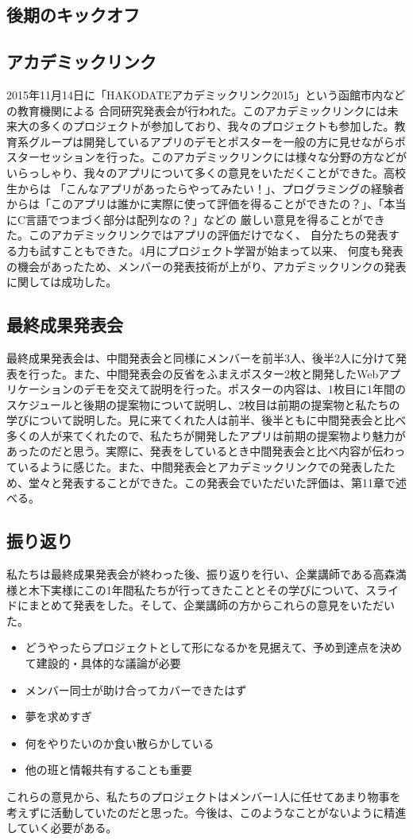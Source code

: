 \documentclass[openany,11pt,papersize]{jsbook}
\begin{document}
\subsection{後期のキックオフ}

\subsection{アカデミックリンク}
2015年11月14日に「HAKODATEアカデミックリンク2015」という函館市内などの教育機関による
合同研究発表会が行われた。このアカデミックリンクには未来大の多くのプロジェクトが参加しており、我々のプロジェクトも参加した。教育系グループは開発しているアプリのデモとポスターを一般の方に見せながらポスターセッションを行った。このアカデミックリンクには様々な分野の方などがいらっしゃり、我々のアプリについて多くの意見をいただくことができた。高校生からは
「こんなアプリがあったらやってみたい！」、プログラミングの経験者からは「このアプリは誰かに実際に使って評価を得ることができたの？」、「本当にC言語でつまづく部分は配列なの？」などの
厳しい意見を得ることができた。このアカデミックリンクではアプリの評価だけでなく、
自分たちの発表する力も試すこともできた。4月にプロジェクト学習が始まって以来、
何度も発表の機会があったため、メンバーの発表技術が上がり、アカデミックリンクの発表に関しては成功した。

\subsection{最終成果発表会}
最終成果発表会は、中間発表会と同様にメンバーを前半3人、後半2人に分けて発表を行った。また、中間発表会の反省をふまえポスター2枚と開発したWebアプリケーションのデモを交えて説明を行った。ポスターの内容は、1枚目に1年間のスケジュールと後期の提案物について説明し、2枚目は前期の提案物と私たちの学びについて説明した。見に来てくれた人は前半、後半ともに中間発表会と比べ多くの人が来てくれたので、私たちが開発したアプリは前期の提案物より魅力があったのだと思う。実際に、発表をしているとき中間発表会と比べ内容が伝わっているように感じた。また、中間発表会とアカデミックリンクでの発表したため、堂々と発表することができた。この発表会でいただいた評価は、第11章で述べる。
\subsection{振り返り}
私たちは最終成果発表会が終わった後、振り返りを行い、企業講師である高森満様と木下実様にこの1年間私たちが行ってきたこととその学びについて、スライドにまとめて発表をした。そして、企業講師の方からこれらの意見をいただいた。
\begin{itemize}
\item 
どうやったらプロジェクトとして形になるかを見据えて、予め到達点を決めて建設的・具体的な議論が必要
\item 
メンバー同士が助け合ってカバーできたはず
\item
夢を求めすぎ
\item
何をやりたいのか食い散らかしている
\item
他の班と情報共有することも重要
\end{itemize}
これらの意見から、私たちのプロジェクトはメンバー1人に任せてあまり物事を考えずに活動していたのだと思った。今後は、このようなことがないように精進していく必要がある。
\end{document}
